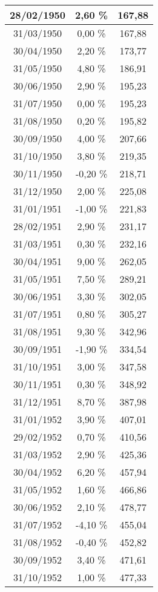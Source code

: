 \begin{center}
\begin{longtable}{|c|c|c|}
28/02/1950 & 2,60 \% & 167,88  \\ \hline
31/03/1950 & 0,00 \% & 167,88  \\ \hline
30/04/1950 & 2,20 \% & 173,77  \\ \hline
31/05/1950 & 4,80 \% & 186,91  \\ \hline
30/06/1950 & 2,90 \% & 195,23  \\ \hline
31/07/1950 & 0,00 \% & 195,23  \\ \hline
31/08/1950 & 0,20 \% & 195,82  \\ \hline
30/09/1950 & 4,00 \% & 207,66  \\ \hline
31/10/1950 & 3,80 \% & 219,35  \\ \hline
30/11/1950 & -0,20 \% & 218,71  \\ \hline
31/12/1950 & 2,00 \% & 225,08  \\ \hline
31/01/1951 & -1,00 \% & 221,83  \\ \hline
28/02/1951 & 2,90 \% & 231,17  \\ \hline
31/03/1951 & 0,30 \% & 232,16  \\ \hline
30/04/1951 & 9,00 \% & 262,05  \\ \hline
31/05/1951 & 7,50 \% & 289,21  \\ \hline
30/06/1951 & 3,30 \% & 302,05  \\ \hline
31/07/1951 & 0,80 \% & 305,27  \\ \hline
31/08/1951 & 9,30 \% & 342,96  \\ \hline
30/09/1951 & -1,90 \% & 334,54  \\ \hline
31/10/1951 & 3,00 \% & 347,58  \\ \hline
30/11/1951 & 0,30 \% & 348,92  \\ \hline
31/12/1951 & 8,70 \% & 387,98  \\ \hline
31/01/1952 & 3,90 \% & 407,01  \\ \hline
29/02/1952 & 0,70 \% & 410,56  \\ \hline
31/03/1952 & 2,90 \% & 425,36  \\ \hline
30/04/1952 & 6,20 \% & 457,94  \\ \hline
31/05/1952 & 1,60 \% & 466,86  \\ \hline
30/06/1952 & 2,10 \% & 478,77  \\ \hline
31/07/1952 & -4,10 \% & 455,04  \\ \hline
31/08/1952 & -0,40 \% & 452,82  \\ \hline
30/09/1952 & 3,40 \% & 471,61  \\ \hline
31/10/1952 & 1,00 \% & 477,33  \\ \hline

\end{longtable}
\end{center}
